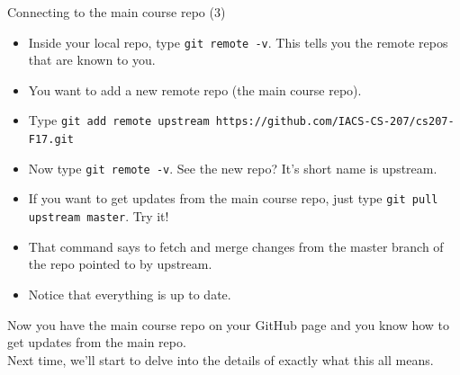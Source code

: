 \documentclass[onlymath, nologo]{beamer}
\begin{document}
  \begin{frame}{Connecting to the main course repo (3)}
    \begin{itemize}
      \item Inside your local repo, type \texttt{git remote -v}.  This tells you 
            the remote repos that are known to you.
      \item You want to add a new remote repo (the main course repo). 
      \item Type \texttt{git add remote upstream https://github.com/IACS-CS-207/cs207-F17.git} 
      \item Now type \texttt{git remote -v}.  See the new repo?  It's short name is upstream. 
      \item If you want to get updates from the main course repo, just type \texttt{git pull upstream master}.
            Try it!
      \item That command says to fetch and merge changes from the master branch of the repo 
            pointed to by upstream.
      \item Notice that everything is up to date. 
    \end{itemize}
    Now you have the main course repo on your GitHub page and you know how to get updates from the 
    main repo. \\[0.5em]
    Next time, we'll start to delve into the details of exactly what this all means.
  \end{frame}
\end{document}
